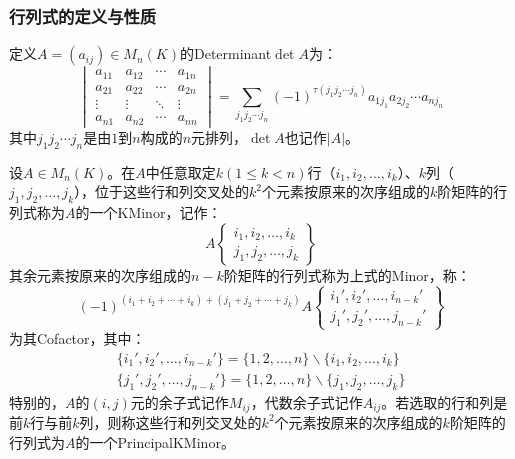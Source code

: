 \subsubsection{行列式的定义与性质}
\begin{definition}
	定义$A=(a_{ij})\in M_{n}(K)$的\gls{Determinant}$\det A$为：
	\begin{equation*}
		\begin{vmatrix}
			a_{11} & a_{12} & \cdots & a_{1n} \\
			a_{21} & a_{22} & \cdots & a_{2n} \\
			\vdots & \vdots & \ddots & \vdots \\
			a_{n1} & a_{n2} & \cdots & a_{nn}
		\end{vmatrix}=
		\sum_{j_1j_2\cdots j_n}^{}(-1)^{\tau(j_1j_2\cdots j_n)}a_{1j_1}a_{2j_2}\cdots a_{nj_n}
	\end{equation*}
	其中$j_1j_2\cdots j_n$是由$1$到$n$构成的$n$元排列，$\det A$也记作$|A|$。
\end{definition} 
\begin{definition}
	设$A\in M_{n}(K)$。在$A$中任意取定$k(1\leqslant k<n)$行（$i_1,i_2,\dots,i_k$）、$k$列（$j_1,j_2,\dots,j_k$），位于这些行和列交叉处的$k^2$个元素按原来的次序组成的$k$阶矩阵的行列式称为$A$的一个\gls{KMinor}，记作：
	\begin{equation*}
		A\left\{ \begin{array}{l}
			i_1,i_2,\dots,i_k \\
			j_1,j_2,\dots,j_k
		\end{array} \right\}
	\end{equation*}
	其余元素按原来的次序组成的$n-k$阶矩阵的行列式称为上式的\gls{Minor}，称：
	\begin{equation*}
		(-1)^{(i_1+i_2+\cdots+i_k)+(j_1+j_2+\cdots+j_k)}A\left\{ \begin{array}{l}
			i_1',i_2',\dots,i_{n-k}' \\
			j_1',j_2',\dots,j_{n-k}'
		\end{array} \right\}
	\end{equation*}
	为其\gls{Cofactor}，其中：
	\begin{gather*}
		\{i_1',i_2',\dots,i_{n-k}'\}=\{1,2,\dots,n\}\backslash\{i_1,i_2,\dots,i_k\} \\
		\{j_1',j_2',\dots,j_{n-k}'\}=\{1,2,\dots,n\}\backslash\{j_1,j_2,\dots,j_k\}
	\end{gather*}
	特别的，$A$的$(i,j)$元的余子式记作$M_{ij}$，代数余子式记作$A_{ij}$。若选取的行和列是前$k$行与前$k$列，则称这些行和列交叉处的$k^2$个元素按原来的次序组成的$k$阶矩阵的行列式为$A$的一个\gls{PrincipalKMinor}。
\end{definition}
